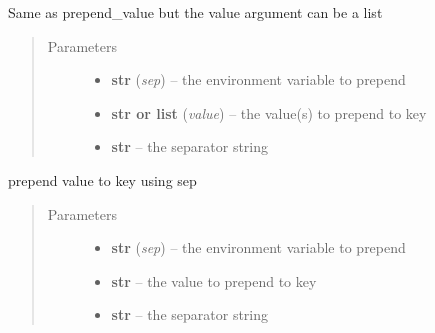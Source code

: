 \documentclass[a4paper,10pt,english]{sphinxmanual}
\begin{document}
\begin{fulllineitems}

\begin{fulllineitems}
\label{commands/apidoc/src:src.fileEnviron.FileEnviron.prepend}
Same as prepend\_value but the value argument can be a list
\begin{quote}\begin{description}
\item[{Parameters}] \leavevmode\begin{itemize}
\item {} 
\textbf{str} (\emph{sep}) -- the environment variable to prepend

\item {} 
\textbf{str or list} (\emph{value}) -- the value(s) to prepend to key

\item {} 
\textbf{str} -- the separator string

\end{itemize}

\end{description}\end{quote}

\end{fulllineitems}


\begin{fulllineitems}
\label{commands/apidoc/src:src.fileEnviron.FileEnviron.prepend_value}
prepend value to key using sep
\begin{quote}\begin{description}
\item[{Parameters}] \leavevmode\begin{itemize}
\item {} 
\textbf{str} (\emph{sep}) -- the environment variable to prepend

\item {} 
\textbf{str} -- the value to prepend to key

\item {} 
\textbf{str} -- the separator string

\end{itemize}

\end{description}\end{quote}


\end{fulllineitems}
\end{fulllineitems}
\end{document}
